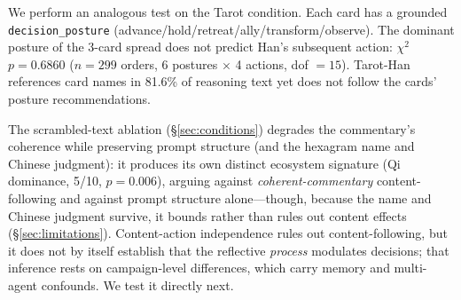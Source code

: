 \documentclass[11pt]{article}
\begin{document}
We perform an analogous test on the Tarot condition. Each card has a grounded \texttt{decision\_posture} (advance/hold/retreat/ally/transform/observe). The dominant posture of the 3-card spread does not predict Han's subsequent action: $\chi^2$ $p = 0.6860$ ($n = 299$ orders, 6 postures $\times$ 4 actions, dof $= 15$). Tarot-Han references card names in 81.6\% of reasoning text yet does not follow the cards' posture recommendations.

The scrambled-text ablation (\S\ref{sec:conditions}) degrades the commentary's coherence while preserving prompt structure (and the hexagram name and Chinese judgment): it produces its own distinct ecosystem signature (Qi dominance, 5/10, $p = 0.006$), arguing against \emph{coherent-commentary} content-following and against prompt structure alone---though, because the name and Chinese judgment survive, it bounds rather than rules out content effects (\S\ref{sec:limitations}). Content-action independence rules out content-following, but it does not by itself establish that the reflective \emph{process} modulates decisions; that inference rests on campaign-level differences, which carry memory and multi-agent confounds. We test it directly next.
\end{document}
